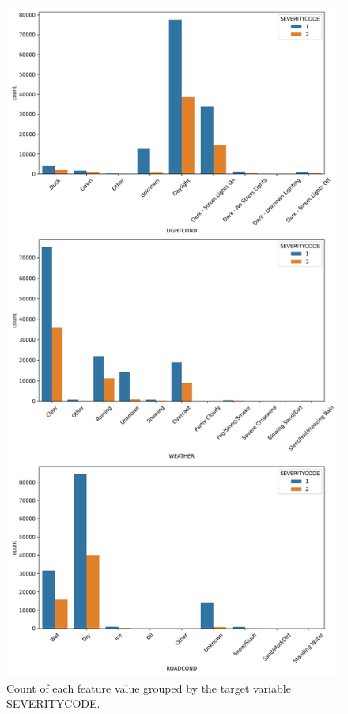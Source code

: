 \documentclass[12pt,a4paper,oneside]{article}
\begin{document}
\begin{figure}[htbp!]
    \centering
    \includegraphics[height=0.95\textheight]{feature_count.png}
    \caption{Count of each feature value grouped by the target variable SEVERITYCODE.}
    \label{fig:feature_count}
\end{figure}
\end{document}

